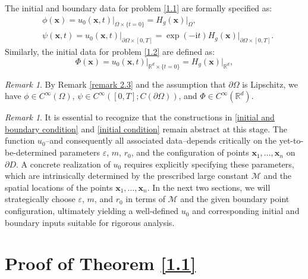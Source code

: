 \documentclass[11pt,reqno,oneside]{amsart}
\numberwithin{equation}{section}
\theoremstyle{definition}
\theoremstyle{remark}
\newtheorem{remark}[theorem]{Remark}
\numberwithin{equation}{section}
\begin{document}
	The initial and boundary data for problem \eqref{1.1} are formally specified as:
	\begin{equation}\label{initial and boundary condition}
		\begin{aligned}
			& \phi(\mathbf{x}) = \left. u_0(\mathbf{x},t) \right|_{\Omega \times \{ t=0 \}} = H_{g}(\mathbf{x})|_{\Omega}, \\
			& \psi(\mathbf{x},t) = u_0 \left. (\mathbf{x},t) \right|_{\partial \Omega \times [0,T]} = \exp(-\mathrm{i} t)H_g(\mathbf{x})|_{\partial \Omega \times [0,T]}.
		\end{aligned}
	\end{equation}
	Similarly, the initial data for problem \eqref{1.2} are defined as:
	\begin{equation}\label{initial condition}
	  \Phi(\mathbf{x}) = \left. u_0(\mathbf{x},t) \right|_{\mathbb{R}^d \times \{ t=0 \}} = H_{g}(\mathbf{x})|_{\mathbb{R}^d}, 
	\end{equation}
	
	\begin{remark}
		By Remark \eqref{remark 2.3} and the assumption that $\partial \Omega$ is Lipschitz, we have $\phi \in C^{\infty}(\Omega)$, $\psi \in C^\infty([0, T]; C(\partial \Omega))$, and $\Phi \in C^{\infty}(\mathbb{R}^d)$.
	\end{remark}
	
	
	\begin{remark}\label{remark 3.8}
		It is essential to recognize that the constructions in \eqref{initial and boundary condition} and \eqref{initial condition} remain abstract at this stage. The function $u_0$--and consequently all associated data--depends critically on the yet-to-be-determined parameters $\varepsilon$, $m$, $r_0$, and the configuration of points $\mathbf{x}_1, \dots, \mathbf{x}_n$ on $\partial D$. A concrete realization of $u_0$ requires explicitly specifying these parameters, which are intrinsically determined by the prescribed large constant $\mathcal{M}$ and the spatial locations of the points $\mathbf{x}_1, \dots, \mathbf{x}_n$. In the next two sections, we will strategically   choose  $\varepsilon$, $m$, and $r_0$ in terms of $\mathcal{M}$ and the given boundary point configuration, ultimately yielding a well-defined $u_0$ and corresponding initial and boundary inputs suitable for rigorous analysis.
	\end{remark}
	
	\section{Proof of Theorem \ref{1.1}}\label{sec:4}
	
\end{document}
